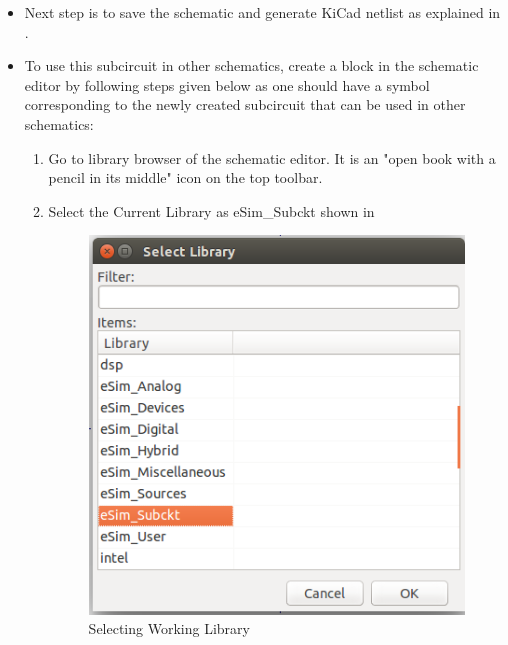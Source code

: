 \begin{itemize}
    \item Next step is to save the schematic and generate KiCad netlist as explained in .

    \item To use this subcircuit in other schematics, create a block in the schematic editor by following steps given below as one should have a symbol corresponding to the newly created subcircuit that can be used in other schematics:
        \begin{enumerate}
            \item Go to library browser of the schematic editor. It is an "open book with a pencil in its middle" icon on the top toolbar.
            \item Select the Current Library as eSim\_Subckt shown in  
                \begin{figure}[!htp]
                    \centering
                    \includegraphics[width =\smfig]{esim-subckt.png}
                    \caption{Selecting Working Library}
                    \label{esimsubckt}
                \end{figure}
            \pagebreak


\end{enumerate}
\end{itemize}
